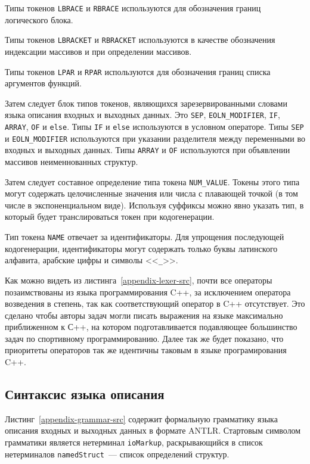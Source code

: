 \documentclass[times,specification,annotation]{style/itmo-student-thesis/itmo-student-thesis}
\begin{document}
Типы токенов \texttt{LBRACE} и \texttt{RBRACE} используются для обозначения границ логического блока.

Типы токенов \texttt{LBRACKET} и \texttt{RBRACKET} используются в качестве обозначения индексации массивов и при определении массивов.

Типы токенов \texttt{LPAR} и \texttt{RPAR} используются для обозначения границ списка аргументов функций.

Затем следует блок типов токенов, являющихся зарезервированными словами языка описания входных и выходных данных. Это \texttt{SEP}, \texttt{EOLN\_MODIFIER}, \texttt{IF}, \texttt{ARRAY}, \texttt{OF} и \texttt{else}. Типы \texttt{IF} и \texttt{else} используются в условном операторе. Типы \texttt{SEP} и \texttt{EOLN\_MODIFIER} используются при указании разделителя между переменными во входных и выходных данных. Типы \texttt{ARRAY} и \texttt{OF} используются при объявлении массивов неименнованных структур.

Затем следует составное определение типа токена \texttt{NUM\_VALUE}. Токены этого типа могут содержать целочисленные значения или числа с плавающей точкой (в том числе в экспоненциальном виде). Используя суффиксы можно явно указать тип, в который будет транслироваться токен при кодогенерации.

Тип токена \texttt{NAME} отвечает за идентификаторы. Для упрощения последующей кодогенерации, идентификаторы могут содержать только буквы латинского алфавита, арабские цифры и символы <<\texttt{\_}>>.

Как можно видеть из листинга~\ref{appendix-lexer-src}, почти все операторы позаимствованы из языка программирования C++, за исключением оператора возведения в степень, так как соответствующий оператор в C++ отсутствует. Это сделано чтобы авторы задач могли писать выражения на языке максимально приближенном к С++, на котором подготавливается подавляющее большинство задач по спортивному программированию. Далее так же будет показано, что приоритеты операторов так же идентичны таковым в языке програмирования C++.

\subsection{Синтаксис языка описания}

Листинг~\ref{appendix-grammar-src} содержит формальную грамматику языка описания входных и выходных данных в формате ANTLR. Стартовым символом грамматики является нетерминал \texttt{ioMarkup}, раскрывающийся в список нетерминалов \texttt{namedStruct}~--- список определений структур.
\end{document}
